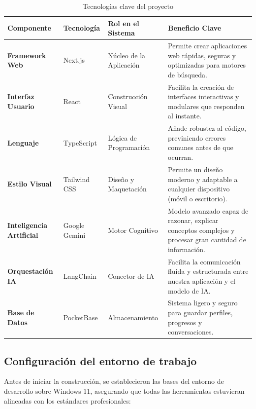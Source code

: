 \begin{table}[H]
\centering
\small
\setlength{\tabcolsep}{4pt}
\renewcommand{\arraystretch}{1.15}
\begin{tabularx}{\textwidth}{lllX}
\hline
\textbf{Componente} & \textbf{Tecnología} & \textbf{Rol en el Sistema} & \textbf{Beneficio Clave} \\
\hline
\textbf{Framework Web} & Next.js & Núcleo de la Aplicación & Permite crear aplicaciones web rápidas, seguras y optimizadas para motores de búsqueda. \\
\hline
\textbf{Interfaz Usuario} & React & Construcción Visual & Facilita la creación de interfaces interactivas y modulares que responden al instante. \\
\hline
\textbf{Lenguaje} & TypeScript & Lógica de Programación & Añade robustez al código, previniendo errores comunes antes de que ocurran. \\
\hline
\textbf{Estilo Visual} & Tailwind CSS & Diseño y Maquetación & Permite un diseño moderno y adaptable a cualquier dispositivo (móvil o escritorio). \\
\hline
\textbf{Inteligencia Artificial} & Google Gemini & Motor Cognitivo & Modelo avanzado capaz de razonar, explicar conceptos complejos y procesar gran cantidad de información. \\
\hline
\textbf{Orquestación IA} & LangChain & Conector de IA & Facilita la comunicación fluida y estructurada entre nuestra aplicación y el modelo de IA. \\
\hline
\textbf{Base de Datos} & PocketBase & Almacenamiento & Sistema ligero y seguro para guardar perfiles, progresos y conversaciones. \\
\hline
\end{tabularx}
\caption{Tecnologías clave del proyecto}
\label{tab:5-1}
\end{table}

\subsection{Configuración del entorno de trabajo}
Antes de iniciar la construcción, se establecieron las bases del entorno de desarrollo sobre Windows 11, asegurando que todas las herramientas estuvieran alineadas con los estándares profesionales:

